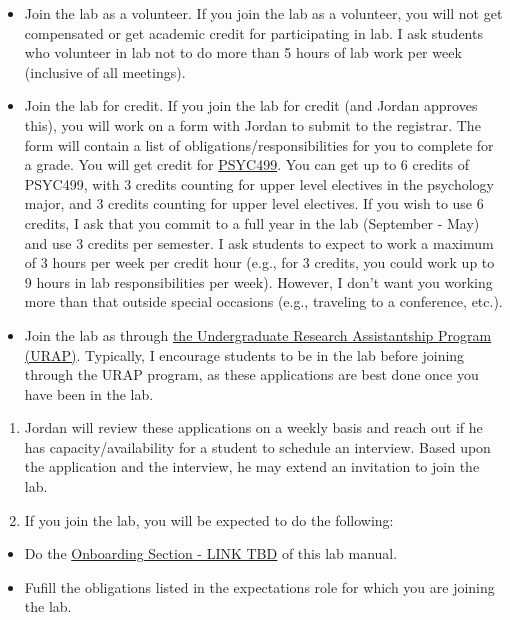 \documentclass[
]{book}
\providecommand{\tightlist}{%
  \setlength{\itemsep}{0pt}\setlength{\parskip}{0pt}}
\begin{document}
\begin{itemize}
\item
  Join the lab as a volunteer. If you join the lab as a volunteer, you will not get compensated or get academic credit for participating in lab. I ask students who volunteer in lab not to do more than 5 hours of lab work per week (inclusive of all meetings).
\item
  Join the lab for credit. If you join the lab for credit (and Jordan approves this), you will work on a form with Jordan to submit to the registrar. The form will contain a list of obligations/responsibilities for you to complete for a grade. You will get credit for \href{https://www.uwp.edu/learn/academiccatalog/2019-2021/psyc.cfm\#courses\#courses}{PSYC499}. You can get up to 6 credits of PSYC499, with 3 credits counting for upper level electives in the psychology major, and 3 credits counting for upper level electives. If you wish to use 6 credits, I ask that you commit to a full year in the lab (September - May) and use 3 credits per semester. I ask students to expect to work a maximum of 3 hours per week per credit hour (e.g., for 3 credits, you could work up to 9 hours in lab responsibilities per week). However, I don't want you working more than that outside special occasions (e.g., traveling to a conference, etc.).
\item
  Join the lab as through \protect\hyperlink{URAP}{the Undergraduate Research Assistantship Program (URAP)}. Typically, I encourage students to be in the lab before joining through the URAP program, as these applications are best done once you have been in the lab.
\end{itemize}

\begin{enumerate}
\def\labelenumi{\arabic{enumi}.}
\setcounter{enumi}{1}
\item
  Jordan will review these applications on a weekly basis and reach out if he has capacity/availability for a student to schedule an interview. Based upon the application and the interview, he may extend an invitation to join the lab.
\item
  If you join the lab, you will be expected to do the following:
\end{enumerate}

\begin{itemize}
\tightlist
\item
  Do the \href{}{Onboarding Section - LINK TBD} of this lab manual.
\item
  Fufill the obligations listed in the expectations role for which you are joining the lab.
\end{itemize}
\end{document}
